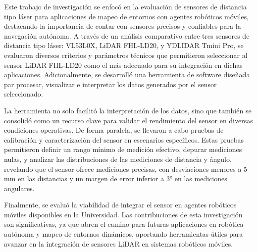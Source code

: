 Este trabajo de investigación se enfocó en la evaluación de sensores de distancia tipo láser para aplicaciones de mapeo de entornos con agentes robóticos móviles, destacando la importancia de contar con sensores precisos y confiables para la navegación autónoma. A través de un análisis comparativo entre tres sensores de distancia tipo láser: VL53L0X, LiDAR FHL-LD20, y YDLIDAR Tmini Pro, se evaluaron diversos criterios y parámetros técnicos que permitieron seleccionar al sensor LiDAR FHL-LD20 como el más adecuado para su integración en dichas aplicaciones. Adicionalmente, se desarrolló una herramienta de software diseñada par procesar, visualizar e interpretar los datos generados por el sensor seleccionado. 

La herramienta no solo facilitó la interpretación de los datos, sino que también se consolidó como un recurso clave para validar el rendimiento del sensor en diversas condiciones operativas. De forma paralela, se llevaron a cabo pruebas de calibración y caracterización del sensor en escenarios específicos. Estas pruebas permitieron definir un rango mínimo de medición efectivo, depurar mediciones nulas, y analizar las distribuciones de las mediciones de distancia y ángulo, revelando que el sensor ofrece mediciones precisas, con desviaciones menores a 5 mm en las distancias y un margen de error inferior a 3° en las mediciones angulares.

Finalmente, se evaluó la viabilidad de integrar el sensor en agentes robóticos móviles disponibles en la Universidad.  Las contribuciones de esta investigación son significativas, ya que abren el camino para futuras aplicaciones en robótica autónoma y mapeo de entornos dinámicos, aportando herramientas útiles para avanzar en la integración de sensores LiDAR en sistemas robóticos móviles.